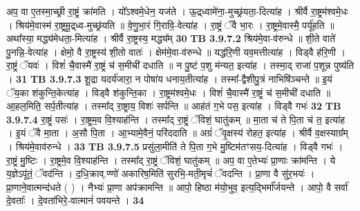 \documentclass[17pt]{extarticle}
\begin{document}
{{{{{{{{{{{{{{{{{{{{{{                  अप॒ वा ए॒तस्मा॒च्छ्री रा॒ष्ट्रं क्रा॑मति । यो᳚ऽश्वमे॒धेन॒ यज॑ते । ऊ॒द्र्ध्वामे॑ना॒-मुच्छ्र॑यता॒-दित्या॑ह । श्रीर्वै रा॒ष्ट्रम॑श्वमे॒धः । श्रिय॑मे॒वास्म॑ रा॒ष्ट्रमू॒द्र्ध्व-मुच्छ्र॑यति ॥ वे॒णु॒भा॒रं गि॒रावि॒-वेत्या॑ह । रा॒ष्ट्रं ॅवै भा॒रः । रा॒ष्ट्रमे॒वास्मै॒ पर्यू॑हति ॥ अथा᳚स्या॒ मद्ध्य॑मेधता॒-मित्या॑ह । श्रीर्वै रा॒ष्ट्रस्य॒ मद्ध्य᳚म् \textbf{ 30} \newline
                  \newline
                                \textbf{ TB 3.9.7.2} \newline
                  श्रिय॑मे॒वा-व॑रुन्धे ॥ शी॒ते वाते॑ पु॒नन्नि॒-वेत्या॑ह । क्षेमो॒ वै रा॒ष्ट्रस्य॑ शी॒तो वातः॑ । क्षेम॑मे॒वा-व॑रुन्धे ॥ यद्ध॑रि॒णी यव॒मत्तीत्या॑ह । विड्वै ह॑रि॒णी । रा॒ष्ट्रं ॅयवः॑ । विशं॑ चै॒वास्मै॑ रा॒ष्ट्रं च॑ स॒मीची॑ दधाति ॥ न पु॒ष्टं प॒शु म॑न्यत॒ इत्या॑ह । तस्मा॒द् राजा॑ प॒शून्न पुष्य॑ति । \textbf{ 31} \newline
                  \newline
                                \textbf{ TB 3.9.7.3} \newline
                  शू॒द्रा यदर्य॑जारा॒ न पोषा॑य धनाय॒तीत्या॑ह । तस्मा᳚-द्वैशीपु॒त्रं नाभिषि॑ञ्चन्ते ॥ इ॒यं ॅय॒का श॑कुन्ति॒केत्या॑ह । विड्वै श॑कुन्ति॒का । रा॒ष्ट्रम॑श्वमे॒धः । विशं॑ चै॒वास्मै॑ रा॒ष्ट्रं च॑ स॒मीची॑ दधाति ॥ आ॒हल॒मिति॒ सर्प॒तीत्या॑ह । तस्मा᳚द् रा॒ष्ट्राय॒ विशः॑ सर्पन्ति ॥ आह॑तं ग॒भे पस॒ इत्या॑ह । विड्वै गभः॑ \textbf{ 32} \newline
                  \newline
                                \textbf{ TB 3.9.7.4} \newline
                  रा॒ष्ट्रं पसः॑ । रा॒ष्ट्रम॒व वि॒श्याह॑न्ति । तस्मा᳚द् रा॒ष्ट्रं ॅविशं॒ घातु॑कम् ॥ मा॒ता च॑ ते पि॒ता च॑ त॒ इत्या॑ह । इ॒यं ॅवै मा॒ता । अ॒सौ पि॒ता । आ॒भ्यामे॒वैनं॒ परि॑ददाति ॥ अग्रं॑ ॅवृ॒क्षस्य॑ रोहत॒ इत्या॑ह । श्रीर्वै व॒क्षस्याग्र᳚म् । श्रिय॑मे॒वाव॑रुन्धे । \textbf{ 33} \newline
                  \newline
                                \textbf{ TB 3.9.7.5} \newline
                  प्रसु॑ला॒मीति॑ ते पि॒ता ग॒भे मु॒ष्टिम॑तꣳसय॒-दित्या॑ह । विड्वै गभः॑ । रा॒ष्ट्रं मु॒ष्टिः । रा॒ष्ट्रमे॒व वि॒श्याह॑न्ति । तस्मा᳚द् रा॒ष्ट्रं ॅविशं॒ घातु॑कम् ॥ अप॒ वा ए॒तेभ्यः॑ प्रा॒णाः क्रा॑मन्ति । ये य॒ज्ञेऽपू॑तं॒ ॅवद॑न्ति । द॒धि॒क्राव्.ण्णो॑ अकारिष॒मिति॑ सुरभि॒-मती॒मृचं॑ ॅवदन्ति । प्रा॒णा वै सु॑र॒भयः॑ । प्रा॒णाने॒वात्मन्द॑धते ( ) । नैभ्यः॑ प्रा॒णा अप॑क्रामन्ति ॥ आपो॒ हिष्ठा म॑यो॒भुव॒ इत्य॒द्भिर्मा᳚र्जयन्ते । आपो॒ वै सर्वा॑ दे॒वताः᳚ । दे॒वता॑भिरे॒-वात्मानं॑ पवयन्ते । \textbf{ 34} \newline
}}}}}}}}}}}}}}}}}}}}}}
\end{document}

